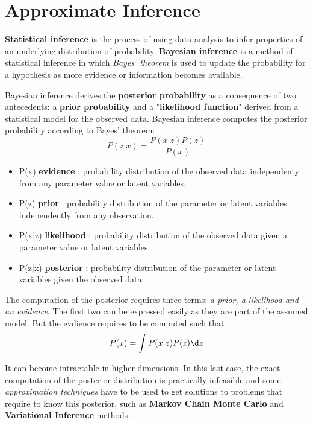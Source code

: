 \chapter{Approximate Inference}
\textbf{Statistical inference} is the process of using data analysis to infer properties of an underlying distribution of probability.
\textbf{Bayesian inference} is a method of statistical inference in which \textit{Bayes' theorem} is used to update the probability for a hypothesis as more evidence or information becomes available.

Bayesian inference derives the \textbf{posterior probability} as a consequence of two antecedents: a \textbf{prior probability} and a "\textbf{likelihood function}" derived from a statistical model
for the observed data. Bayesian inference computes the posterior probability according to Bayes' theorem:
\begin{equation}
    P(z|x) = \frac{P(x|z)P(z)}{P(x)}
\end{equation}

\begin{itemize}
    \item P(x) \textbf{evidence} : probability distribution of the observed data independenty from any parameter value or latent variables.
    \item P(z) \textbf{prior} : probability distribution of the parameter or latent variables independently from any observation.
    \item P(x|z) \textbf{likelihood} : probability distribution of the observed data given a parameter value or latent variables.
    \item P(z|x) \textbf{posterior} : probability distribution of the parameter or latent variables given the observed data.
\end{itemize}

The computation of the posterior requires three terms: \textit{a prior, a likelihood and an evidence}. The first two can be expressed easily as they are 
part of the assumed model. But the evdience requires to be computed such that
\begin{equation}
    P(x) = \int P(x|z)P(z) \d z
\end{equation}

It can become intractable in higher dimensions. In this last case, the exact computation of the posterior distribution is practically infeasible and some \textit{approximation techniques} have to be used to
get solutions to problems that require to know this posterior, such as \textbf{Markov Chain Monte Carlo} and \textbf{Variational Inference} methods.

